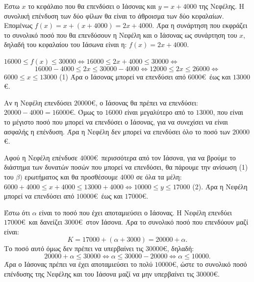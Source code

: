 
\begin{alist}
\item Έστω $x$ το κεφάλαιο που θα επενδύσει ο Ιάσονας και $y = x + 4000$ της Νεφέλης. Η συνολική επένδυση των δύο φίλων θα είναι το άθροισμα των δύο κεφαλαίων. Επομένως $f(x) = x + (x + 4000) = 2x + 4000$.
Άρα η συνάρτηση που εκφράζει το συνολικό ποσό που θα επενδύσουν η Νεφέλη και ο Ιάσονας ως συνάρτηση του $x$, δηλαδή του κεφαλαίου του Ιάσωνα είναι η:
$f(x) = 2x + 4000$.

\item
\begin{rlist}
\item $16000 \le f(x) \le 30000 \Leftrightarrow 16000 \le 2x + 4000 \le 30000 \Leftrightarrow$
\[16000 - 4000 \le 2x \le 30000 - 4000 \Leftrightarrow 12000 \le 2x \le 26000 \Leftrightarrow\]
$6000 \le x \le 13000$ (1)
Άρα ο Ιάσονας μπορεί να επενδύσει από $6000$\euro\ έως και $13000$\euro.

\item Αν η Νεφέλη επενδύσει $20000$\euro, ο Ιάσονας θα πρέπει να επενδύσει:
$20000 - 4000 = 16000$\euro.
Όμως το $16000$ είναι μεγαλύτερο από το $13000$, που είναι το μέγιστο ποσό που μπορεί να επενδύσει ο Ιάσονας, για να συνεχίσει να είναι ασφαλής η επένδυση. Άρα η Νεφέλη δεν μπορεί να επενδύσει όλο το ποσό των $20000$\euro.

\item Αφού η Νεφέλη επένδυσε $4000$\euro\ περισσότερα από τον Ιάσονα, για να βρούμε το διάστημα των δυνατών ποσών που μπορεί να επενδύσει, θα πάρουμε την ανίσωση (1) του $\beta)$ ερωτήματος και θα προσθέσουμε $4000$ σε όλα τα μέλη:
$6000 + 4000 \le x + 4000 \le 13000 + 4000 \Leftrightarrow 10000 \le y \le 17000$ (2).
Άρα η Νεφέλη μπορεί να επενδύσει από $10000$\euro\ έως και $17000$\euro.
\end{rlist}

\item Έστω ότι $\alpha$ είναι το ποσό που έχει αποταμιεύσει ο Ιάσονας. Η Νεφέλη επενδύει $17000$\euro\ και δανείζει $3000$\euro\ στον Ιάσονα. Άρα το συνολικό ποσό που επενδύουν μαζί είναι:
\[K = 17000 + (\alpha + 3000) = 20000 + \alpha.\]
Το ποσό αυτό όμως δεν πρέπει να υπερβαίνει τις $30000$\euro, δηλαδή:
\[20000 + \alpha \le 30000 \Leftrightarrow \alpha \le 30000 - 20000 \Leftrightarrow \alpha \le 10000.\]
Άρα ο Ιάσονας πρέπει να έχει αποταμιεύσει το πολύ $10000$\euro, ώστε το συνολικό ποσό επένδυσης της Νεφέλης και του Ιάσονα μαζί να μην υπερβαίνει τις $30000$\euro.
\end{alist}

